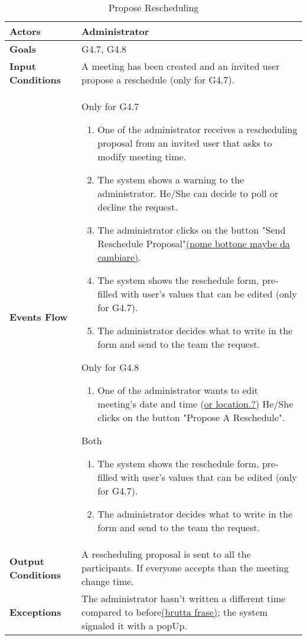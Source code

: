 \begin{table}[H]
	\centering
	\def\arraystretch{1.5}
	\begin{tabular}{|p{7cm}|p{7cm}|}
		\hline
		\textbf{Actors}            & Administrator    \\ \hline
		\textbf{Goals}             & G4.7, G4.8           \\ \hline
		\textbf{Input Conditions}  & A meeting has been created and an invited user propose a reschedule (only for G4.7).           \\ \hline
		\textbf{Events Flow}       & Only for G4.7
		\begin{enumerate}[topsep=0pt, leftmargin=*]				
			\item One of the administrator receives a rescheduling proposal from an invited user that asks to modify meeting time.
			\item The system shows a warning to the administrator. He/She can decide to poll  or decline the request.
			\item The administrator clicks on the button "Send Reschedule Proposal"\underline{(nome bottone maybe da cambiare)}.
			\item The system shows the reschedule form, pre-filled with user's values that can be edited (only for G4.7).
			\item The administrator decides what to write in the form and send to the team the request.
		\end{enumerate}
		Only for G4.8
		\begin{enumerate}[topsep=0pt, leftmargin=*]
			\item One of the administrator wants to edit meeting's date and time (\underline{or location.?}) He/She clicks on the button "Propose A Reschedule".
		\end{enumerate}  
		Both
		\begin{enumerate}[topsep=0pt, leftmargin=*]
			\item The system shows the reschedule form, pre-filled with user's values that can be edited (only for G4.7).
			\item The administrator decides what to write in the form and send to the team the request.
		\end{enumerate}                         \\ \hline
		\textbf{Output Conditions} & A rescheduling proposal is sent to all the participants. If everyone accepts than the meeting change time.         \\ \hline
		\textbf{Exceptions}        & The administrator hasn't written a different time compared to before\underline{(brutta frase)}; the system signaled it with a popUp.        \\ \hline
	\end{tabular}
	\caption{Propose Rescheduling}
\end{table}